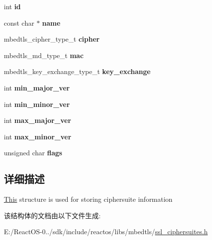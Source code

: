 \begin{DoxyCompactItemize}
\item 
\mbox{\label{structmbedtls__ssl__ciphersuite__t_a04315a97cb3a0c4f2065131095af18f9}} 
int {\bfseries id}
\item 
\mbox{\label{structmbedtls__ssl__ciphersuite__t_aa77bcf2ac4c95f819bd1fd3c60daf7c6}} 
const char $\ast$ {\bfseries name}
\item 
\mbox{\label{structmbedtls__ssl__ciphersuite__t_ab700258b521262a10786ee820009d0bd}} 
mbedtls\+\_\+cipher\+\_\+type\+\_\+t {\bfseries cipher}
\item 
\mbox{\label{structmbedtls__ssl__ciphersuite__t_a4ff359e034af1dd11eee3af8ba90e33b}} 
mbedtls\+\_\+md\+\_\+type\+\_\+t {\bfseries mac}
\item 
\mbox{\label{structmbedtls__ssl__ciphersuite__t_a4099ed119c2893364c2d3e1eba397106}} 
mbedtls\+\_\+key\+\_\+exchange\+\_\+type\+\_\+t {\bfseries key\+\_\+exchange}
\item 
\mbox{\label{structmbedtls__ssl__ciphersuite__t_a1a9b466f9fd946543595fc7edb47f3e7}} 
int {\bfseries min\+\_\+major\+\_\+ver}
\item 
\mbox{\label{structmbedtls__ssl__ciphersuite__t_aee8ff3239d90fdca2edeb4f4aec3776e}} 
int {\bfseries min\+\_\+minor\+\_\+ver}
\item 
\mbox{\label{structmbedtls__ssl__ciphersuite__t_aa0c974d0a42ecdf41cc8a0f23276cd37}} 
int {\bfseries max\+\_\+major\+\_\+ver}
\item 
\mbox{\label{structmbedtls__ssl__ciphersuite__t_a30838dbab879beba0059b2a56529177d}} 
int {\bfseries max\+\_\+minor\+\_\+ver}
\item 
\mbox{\label{structmbedtls__ssl__ciphersuite__t_a91c0ec15468b4cbb8f4f1c9861fe2456}} 
unsigned char {\bfseries flags}
\end{DoxyCompactItemize}


\subsection{详细描述}
\hyperlink{namespace_this}{This} structure is used for storing ciphersuite information 

该结构体的文档由以下文件生成\+:\begin{DoxyCompactItemize}
\item 
E\+:/\+React\+O\+S-\/0../sdk/include/reactos/libs/mbedtls/\hyperlink{ssl__ciphersuites_8h}{ssl\+\_\+ciphersuites.\+h}\end{DoxyCompactItemize}
